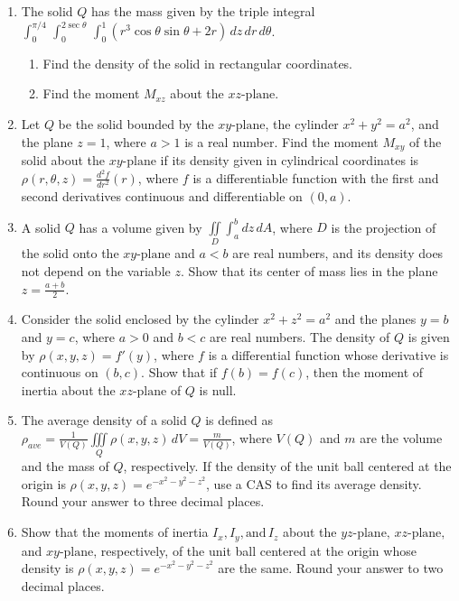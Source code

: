 \documentclass{exercises}
\begin{document}
\begin{enumerate}[resume]
\item The solid $Q$ has the mass given by the triple integral $\int_{0}^{\pi/4}\,\int_{0}^{2\sec \theta}\,\int_{0}^{1}(r^{3}\cos \theta \sin \theta+2r)\,dz\,dr\,d\theta$.
\begin{enumerate}[label=(\alph*)]
  \item Find the density of the solid in rectangular coordinates.
  \item Find the moment $M_{xz}$ about the $xz\text{-plane.}$
\end{enumerate}
\item Let $Q$ be the solid bounded by the $xy\text{-plane}$, the cylinder $x^{2}+y^{2}=a^{2}$, and the plane $z=1$, where $a>1$ is a real number. Find the moment $M_{xy}$ of the solid about the $xy\text{-plane}$ if its density given in cylindrical coordinates is $\rho(r,\theta,z)=\frac{d^{2}f}{dr^{2}}(r)$, where $f$ is a differentiable function with the first and second derivatives continuous and differentiable on $(0,a)$.
\item A solid $Q$ has a volume given by $\underset{D}{\iint}\int_{a}^{b}dz\,dA$, where $D$ is the projection of the solid onto the $xy\text{-plane}$ and $a<b$ are real numbers, and its density does not depend on the variable $z$. Show that its center of mass lies in the plane $z=\frac{a+b}{2}$.
\item Consider the solid enclosed by the cylinder $x^{2}+z^{2}=a^{2}$ and the planes $y=b$ and $y=c$, where $a>0$ and $b<c$ are real numbers. The density of $Q$ is given by $\rho(x,y,z)=f'(y)$, where $f$ is a differential function whose derivative is continuous on $(b,c)$. Show that if $f(b)=f(c)$, then the moment of inertia about the $xz\text{-plane}$ of $Q$ is null.
\item \techrequired The average density of a solid $Q$ is defined as $\rho_{ave}=\frac{1}{V(Q)}\underset{Q}{\iiint}\rho(x,y,z)\,dV=\frac{m}{V(Q)}$, where $V(Q)$ and $m$ are the volume and the mass of $Q$, respectively. If the density of the unit ball centered at the origin is $\rho(x,y,z)=e^{-x^{2}-y^{2}-z^{2}}$, use a CAS to find its average density. Round your answer to three decimal places.
\item Show that the moments of inertia $I_{x},I_{y},\text{and}\,I_{z}$ about the $yz\text{-plane,}$ $xz\text{-plane,}$ and $xy\text{-plane,}$ respectively, of the unit ball centered at the origin whose density is $\rho(x,y,z)=e^{-x^{2}-y^{2}-z^{2}}$ are the same. Round your answer to two decimal places.
\end{enumerate}
\end{document}
